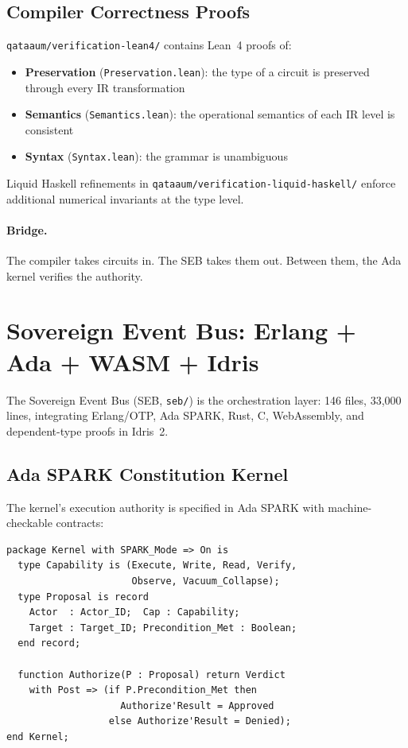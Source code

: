 \documentclass[11pt,a4paper]{article}
\begin{document}
\subsection{Compiler Correctness Proofs}

\texttt{qataaum/verification-lean4/} contains Lean~4 proofs of:
\begin{itemize}[noitemsep]
\item \textbf{Preservation} (\texttt{Preservation.lean}): the type of a
  circuit is preserved through every IR transformation
\item \textbf{Semantics} (\texttt{Semantics.lean}): the operational
  semantics of each IR level is consistent
\item \textbf{Syntax} (\texttt{Syntax.lean}): the grammar is unambiguous
\end{itemize}

Liquid Haskell refinements in
\texttt{qataaum/verification-liquid-haskell/} enforce additional
numerical invariants at the type level.

\paragraph{Bridge.} The compiler takes circuits in. The SEB takes them
out. Between them, the Ada kernel verifies the authority.

\section{Sovereign Event Bus: Erlang + Ada + WASM + Idris}

The Sovereign Event Bus (SEB, \texttt{seb/}) is the orchestration layer:
146 files, 33,000 lines, integrating Erlang/OTP, Ada SPARK, Rust, C,
WebAssembly, and dependent-type proofs in Idris~2.

\subsection{Ada SPARK Constitution Kernel}

The kernel's execution authority is specified in Ada SPARK with
machine-checkable contracts:

\begin{lstlisting}[language={}]
package Kernel with SPARK_Mode => On is
  type Capability is (Execute, Write, Read, Verify,
                      Observe, Vacuum_Collapse);
  type Proposal is record
    Actor  : Actor_ID;  Cap : Capability;
    Target : Target_ID; Precondition_Met : Boolean;
  end record;

  function Authorize(P : Proposal) return Verdict
    with Post => (if P.Precondition_Met then
                    Authorize'Result = Approved
                  else Authorize'Result = Denied);
end Kernel;
\end{lstlisting}
\end{document}
